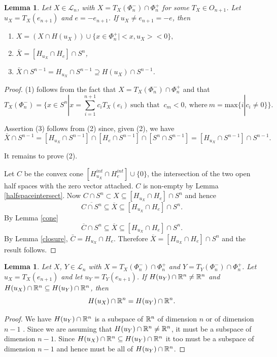 \documentclass[psamsfonts]{amsart}
\numberwithin{equation}{subsection}
\theoremstyle{plain}
\newtheorem{lemma}[theorem]{Lemma}
\theoremstyle{definition}
\theoremstyle{remark}
\begin{document}
\begin{lemma} \label{boundary} Let $X \in \mathcal{L}_n$, with $X = T_X(\Phi^-_n)\cap \Phi^+_n$ for some $T_X \in O_{n + 1}$.
Let $u_X = T_X(e_{n + 1})$ and $e = -e_{n + 1}$.
 If $u_X \not=   e_{n + 1} = -e$, 
then 
\begin{enumerate}
\item $X = (X\cap H(u_X)) \cup \{x \in \Phi_n^+ | <x, u_X> < 0 \},$
\item $\bar{X} =  [H_{u_X} \cap H_{e}] \cap S^n$,
\item $\bar{X} \cap S^{n -1} = H_{u_X}\cap S^{n - 1} \supseteq H(u_X)\cap S^{n - 1}$.
\end{enumerate}
\end{lemma}
\begin{proof}
(1) follows from the fact that $X = T_X(\Phi^-_n) \cap \Phi^+_n$ and that $$
T_X(\Phi_n^-) = \{x \in S^n| x = \sum_{i = 1}^{n + 1}c_iT_X(e_i) \ \mbox{such that } \ c_m < 0 , \ \mbox{where} \ 
m = \mbox{max}\{i| c_i \not= 0\}\}.$$

Assertion (3) follows from (2) since, given (2), we have 
$$\bar{X}\cap S^{n -1} = [H_{u_X}\cap S^{n - 1}] \cap
[H_{e} \cap S^{n - 1}] \cap [S^n  \cap S^{n - 1}] = [H_{u_X}\cap S^{n - 1}]  \cap S^{n - 1}.$$ 

It remains to prove (2). 

 Let $C$ be the convex cone $[H_{u_X}^{int} \cap H_{e}^{int}] \cup \{0\}$, the intersection of the two open half spaces with the zero vector attached.  $C$ is non-empty by Lemma \ref{halfspaceintersect}.
Now  $C \cap S^{n} \subset X \subseteq [H_{u_X} \cap H_{e}]\cap S^n $ and hence $$
\overline{C \cap S^{n} }  \subseteq \overline{X}  \subseteq [H_{u_X} \cap H_{e}]\cap S^n .$$ 
By Lemma \ref{cone} 
$$\overline{C} \cap S^{n}   \subseteq \overline{X}  \subseteq [H_{u_X} \cap H_{e}]\cap S^n. $$
 By Lemma \ref{closure}, $\bar{C} = H_{u_X} \cap H_{e}$.
Therefore  $\overline{X}  =  [H_{u_X} \cap H_{e}]\cap S^n$
and the result follows.  
 \end{proof}



 \begin{lemma} \label{equality} 
  Let $X$, $Y \in \mathcal{L}_n$ with $X = T_X(\Phi_n^-) \cap \Phi_n^+$ and 
  $Y = T_Y(\Phi_n^-) \cap \Phi_n^+$. 
  Let $u_X = T_X(e_{n + 1})$  and let $u_Y = T_Y(e_{n + 1})$. 
  If $H(u_Y) \cap \Bbb{R}^{n } \not= \Bbb{R}^{n }$ and 
  $H(u_X) \cap \Bbb{R}^{n } \subseteq H(u_Y) \cap \Bbb{R}^{n }$, then 
  $$H(u_X) \cap \Bbb{R}^{n } = H(u_Y) \cap \Bbb{R}^{n }.$$
  \end{lemma}
  \begin{proof}
  We have $ H(u_Y)\cap \Bbb{R}^{n } $ is a subspace of $\Bbb{R}^{n}$ of dimension $n$ or of dimension $n - 1$ . Since we are assuming that  $H(u_Y) \cap \Bbb{R}^{n } \not= \Bbb{R}^{n }$, it must be a subspace of dimension $n - 1$. Since $H(u_X) \cap \Bbb{R}^n \subseteq H(u_Y) \cap \Bbb{R}^n$ it too must be a subspace of dimension $n - 1$ and hence must be all of $H(u_Y) \cap \Bbb{R}^n$. 
  \end{proof}
\end{document}
